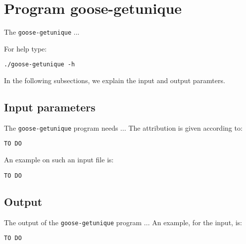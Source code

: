 \section{Program goose-getunique}
The \texttt{goose-getunique} ...

For help type:
\begin{lstlisting}
./goose-getunique -h
\end{lstlisting}
In the following subsections, we explain the input and output paramters.

\subsection{Input parameters}

The \texttt{goose-getunique} program needs ...
The attribution is given according to:
\begin{lstlisting}
TO DO
\end{lstlisting}

An example on such an input file is:
\begin{lstlisting}
TO DO
\end{lstlisting}

\subsection{Output}
The output of the \texttt{goose-getunique} program ...
An example, for the input, is:
\begin{lstlisting}
TO DO
\end{lstlisting}
